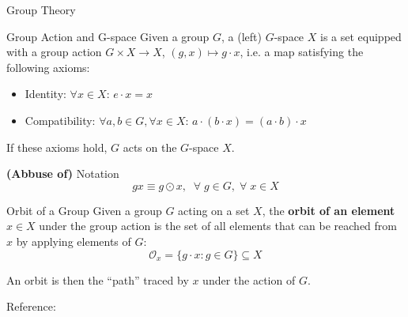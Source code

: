 \documentclass[9pt,dvipsnames]{beamer}
\begin{document}
\begin{frame}{Group Theory}

	\begin{block}{Group Action and G-space}
		Given a group $G$, a (left) $G$-space $X$ is a set equipped with a group action $G \times X \to X$, $(g, x) \mapsto g \cdot x$, i.e. a map satisfying the following axioms:
		\begin{itemize}
			\item Identity: $\forall x \in X$: \quad $e \cdot x = x$
			\item Compatibility: $\forall a, b \in G, \forall x \in X$: \quad $a \cdot (b \cdot x) = (a \cdot b) \cdot x$
		\end{itemize}
		If these axioms hold, $G$ acts on the $G$-space $X$.
	\end{block}

	\begin{alertblock}{\textbf{(Abbuse of)} Notation}
		\begin{equation*}
			gx \equiv g \odot x, \;\; \forall \; g \in G, \; \forall \; x \in X
		\end{equation*}
	\end{alertblock}

	\begin{block}{Orbit of a Group}
		Given a group $G$ acting on a set $X$, the \textbf{orbit of an element} $x \in X$ under the group action is the set of all elements that can be reached from $x$ by applying elements of $G$:
		\begin{equation*}
			\mathcal{O}_x = \{g \cdot x : g \in G\} \subseteq X
		\end{equation*}
	\end{block}

	An orbit is then the ``path'' traced by $x$ under the action of $G$.

	Reference: \cite{veefkind_probabilistic_2024}

\end{frame}
\end{document}
